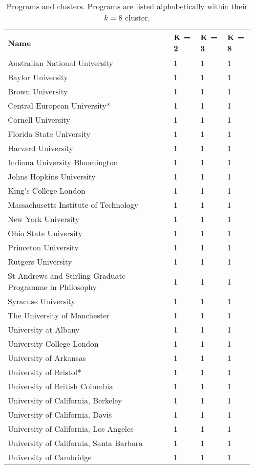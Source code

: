 
\begin{longtable}[t]{llll}
\caption{\label{tab:university.cluster}Programs and clusters.  Programs are listed alphabetically within their $k=8$ cluster.}\\
\toprule
Name & K = 2 & K = 3 & K = 8\\
\midrule
Australian National University & 1 & 1 & 1\\
Baylor University & 1 & 1 & 1\\
Brown University & 1 & 1 & 1\\
Central European University* & 1 & 1 & 1\\
Cornell University & 1 & 1 & 1\\
\addlinespace
Florida State University & 1 & 1 & 1\\
Harvard University & 1 & 1 & 1\\
Indiana University Bloomington & 1 & 1 & 1\\
Johns Hopkins University & 1 & 1 & 1\\
King's College London & 1 & 1 & 1\\
\addlinespace
Massachusetts Institute of Technology & 1 & 1 & 1\\
New York University & 1 & 1 & 1\\
Ohio State University & 1 & 1 & 1\\
Princeton University & 1 & 1 & 1\\
Rutgers University & 1 & 1 & 1\\
\addlinespace
St Andrews and Stirling Graduate Programme in Philosophy & 1 & 1 & 1\\
Syracuse University & 1 & 1 & 1\\
The University of Manchester & 1 & 1 & 1\\
University at Albany & 1 & 1 & 1\\
University College London & 1 & 1 & 1\\
\addlinespace
University of Arkansas & 1 & 1 & 1\\
University of Bristol* & 1 & 1 & 1\\
University of British Columbia & 1 & 1 & 1\\
University of California, Berkeley & 1 & 1 & 1\\
University of California, Davis & 1 & 1 & 1\\
\addlinespace
University of California, Los Angeles & 1 & 1 & 1\\
University of California, Santa Barbara & 1 & 1 & 1\\
University of Cambridge & 1 & 1 & 1\\

\end{longtable}
